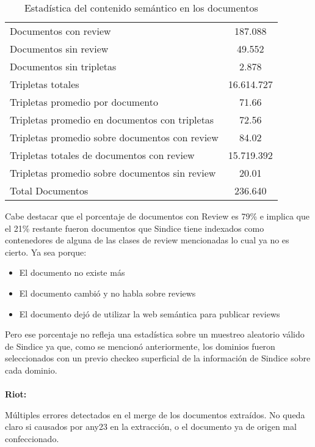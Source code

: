 \begin{table}[h]
\begin{tabular}{| l | c | }\hline
Documentos con review & 187.088 \\
Documentos sin review & 49.552\\
Documentos sin tripletas & 2.878\\
Tripletas totales & 16.614.727\\
Tripletas promedio por documento & 71.66\\
Tripletas promedio en documentos con tripletas & 72.56\\
Tripletas promedio sobre documentos con review & 84.02\\
Tripletas totales de documentos con review & 15.719.392\\
Tripletas promedio sobre documentos sin review & 20.01\\\hline
Total Documentos & 236.640\\\hline
\end{tabular}
\caption{Estadística del contenido semántico en los documentos}
\label{table:SemanticaEnDocumentows}
\end{table}

Cabe destacar que el porcentaje de documentos con Review es 79\% e implica que el 21\% restante fueron documentos que Sindice tiene indexados como contenedores de 
alguna de las clases de review mencionadas lo cual ya no es cierto. Ya sea porque:
\begin{itemize}
\item El documento no existe más
\item El documento cambió y no habla sobre reviews
\item El documento dejó de utilizar la web semántica para publicar reviews
\end{itemize}
Pero ese porcentaje no refleja una estadística sobre un muestreo aleatorio válido de Sindice ya que, como se mencionó anteriormente, los dominios fueron seleccionados 
con un previo checkeo superficial de la información de Sindice sobre cada dominio.
\\
\\
\textbf{Riot:}

\noindent Múltiples errores detectados en el merge de los documentos extraídos. No queda claro si causados por any23 en la extracción, o el documento ya de origen 
mal confeccionado. 

